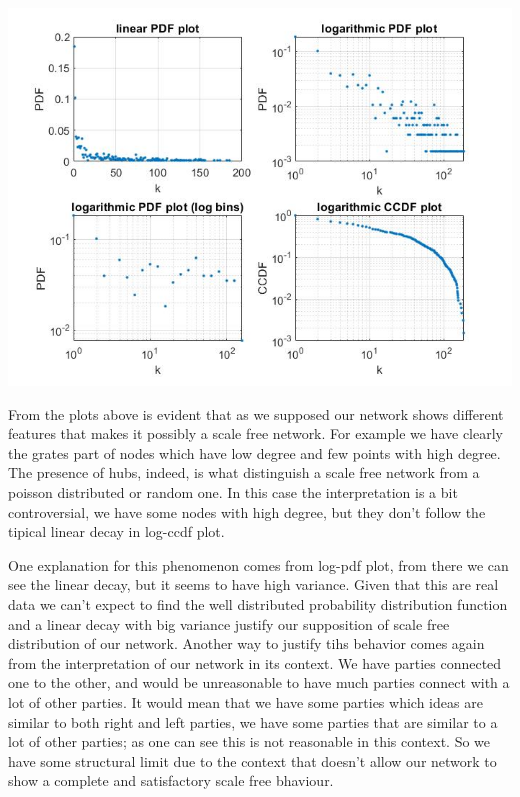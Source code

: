 \documentclass{article}%
\begin{document}
\includegraphics[scale=0.5]{Degree_distr}

From the plots above is evident that as we supposed our network shows different features that makes it possibly a scale free network. For example we have clearly the grates part of nodes which have low degree and few points with high degree. The presence of hubs, indeed, is what distinguish a scale free network from a poisson distributed or random one. In this case the interpretation is a bit controversial, we have some nodes with high degree, but they don't follow the tipical linear decay in log-ccdf plot. 

One explanation for this phenomenon comes from log-pdf plot, from there we can see the linear decay, but it seems to have high variance. Given that this are real data we can't expect to find the well distributed probability distribution function and a linear decay with big variance justify our supposition of scale free distribution of our network.
Another way to justify tihs behavior comes again from the interpretation of our network in its context. We have parties connected one to the other, and would be unreasonable to have much parties connect with a lot of other parties. It would mean that we have some parties which ideas are similar to both right and left parties, we have some parties that are similar to a lot of other parties; as one can see this is not reasonable in this context. So we have some structural limit due to the context that doesn't allow our network to show a complete and satisfactory scale free bhaviour.
\end{document}
